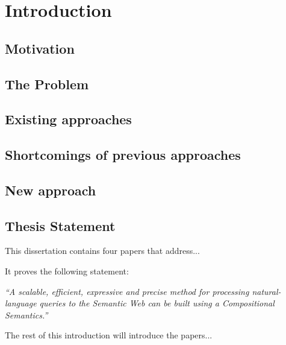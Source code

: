 \documentclass[../main.tex]{subfiles}
\begin{document}
\chapter{Introduction}
\begin{refsection}

\label{chapter:intro}


\section{Motivation}


\section {The Problem}




\section {Existing approaches}



\section {Shortcomings of previous approaches}


\section {New approach}


\section{Thesis Statement}

This dissertation contains four papers that address...

It proves the following statement:

\textit{``A scalable, efficient, expressive and precise method for processing natural-language queries to the Semantic Web can be built using a Compositional Semantics.''}

The rest of this introduction will introduce the papers...


\end{refsection}
\end{document}

